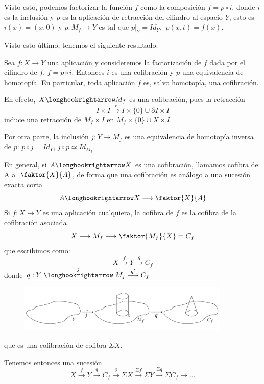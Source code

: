 Visto esto, podemos factorizar la función $f$ como la composición $f = p \circ i$, donde $i$ es la inclusión y $p$ es la aplicación de retracción del cilindro al espacio $Y$, esto es $i(x) = (x,0)$  y $p : M_f \longrightarrow Y$  es tal que $p \vert_Y = Id_Y$, $\ p(x,t) = f(x)$. \par 
Visto esto último, tenemos el siguiente resultado:
\newpage
\begin{teor}
Sea $f : X \longrightarrow Y$ una aplicación y consideremos la factorización de $f$ dada por el cilindro de $f$, $f = p \circ i$. Entonces $i$ es una cofibración y $p$ una equivalencia de homotopía. En particular, toda aplicación $f$ es, salvo homotopía, una cofibración. 
\end{teor}
\begin{demo}
En efecto, $X \longhookrightarrow M_f$ es una cofibración, pues la retracción 
\[
I \times I \stackrel{r}{\longrightarrow} I \times \{0\} \cup \partial I \times I
\]
induce una retracción de $M_f \times I$ en $M_f \times \{0\} \cup X \times  I$. \par 
Por otra parte, la inclusión $j : Y \longrightarrow M_f$ es una equivalencia de homotopía inversa de $p$: $p \circ j = Id_Y$, $j \circ p \simeq Id_{M_f}$.
\end{demo}
En general, si $A \longhookrightarrow X$ es una cofibración, llamamos cofibra de A a $\: \faktor{X}{A}$, de forma que una cofibración es análogo a una sucesión exacta corta
\[ A \longhookrightarrow X \longrightarrow \faktor{X}{A} \]
Si $f : X \longrightarrow Y$ es una aplicación cualquiera, la cofibra de $f$ es la cofibra de la cofibración asociada
\[ X \longrightarrow M_f \longrightarrow \faktor{M_f}{X} = C_f \]
que escribimos como: 
\[ X \stackrel{f}{\longrightarrow} Y \stackrel{q}{\longrightarrow} C_f  \]
donde $q : Y \stackrel{j}{\longhookrightarrow} M_f \stackrel{q'}{\longrightarrow} C_f $\par 
\begin{figure}[h]
\centering
\includegraphics[width = 0.9\textwidth]{images/cilindycono}
\end{figure}
que es una cofibración de cofibra $\Sigma X$. \par
Tenemos entonces una sucesión
\[ X \stackrel{f}{\longrightarrow} Y \stackrel{q}{\longrightarrow} C_f \stackrel{\delta}{\longrightarrow} \Sigma X \stackrel{\Sigma f}{\longrightarrow} \Sigma Y \stackrel{\Sigma q}{\longrightarrow} \Sigma C_f \longrightarrow \dots \]
